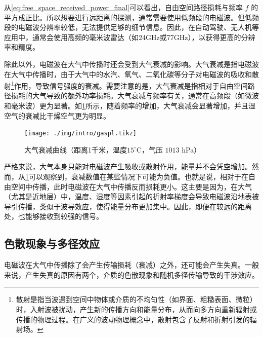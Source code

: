 从\cref{eq:free_space_received_power_final}可以看出，自由空间路径损耗与频率 $f$ 的平方成正比。所以想要进行远距离的探测，通常需要使用低频段的电磁波。但低频段的电磁波分辨率较低，无法提供足够的细节信息。因此，在自动驾驶、无人机等应用中，通常会使用高频的毫米波雷达（如24GHz或77GHz），以获得更高的分辨率和精度。

除此以外，电磁波在大气中传播时还会受到大气衰减的影响。大气衰减是指电磁波在大气中传播时，由于大气中的水汽、氧气、二氧化碳等分子对电磁波的吸收和散射\footnote{散射是指当波遇到空间中物体或介质的不均匀性（如界面、粗糙表面、微粒）时，入射波被扰动，产生新的传播方向和能量分布，从而向多方向重新辐射或传播的物理过程。在广义的波动物理概念中，散射包含了反射和折射引发的辐射场。}作用，导致信号强度的衰减。需要注意的是，大气衰减是指相对于自由空间路径损耗的大气导致的额外功率损耗。大气衰减与频率有关，通常在高频段（如微波和毫米波）更为显著。如\cref{fig_chp1_gaspl}所示，随着频率的增加，大气衰减会显著增加，并且湿空气的衰减比干燥空气更为明显。

\begin{figure}[htb!]
    \centering
    \texttt{[image: ./img/intro/gaspl.tikz]}
    \caption{大气衰减曲线\supercite{itu_r_p676_11}（距离1千米，温度$15^\circ$C，气压 $1013$ hPa）}
    \label{fig_chp1_gaspl}
\end{figure}

严格来说，大气本身只能对电磁波产生吸收或散射作用，能量并不会凭空增加。然而，从\cref{fig_chp1_gaspl}可以观察到，衰减数值在某些情况下可能为负值。也就是说，相对于在自由空间中传播，此时电磁波在大气中传播反而损耗更小。这主要是因为，在大气（尤其是近地层）中，温度、湿度等因素引起的折射率梯度会导致电磁波沿地表被导引传播，类似于波导效应，使得能量分布更加集中。因此，即便在较远的距离处，也能够接收到较强的信号。

\subsection{色散现象与多径效应}
电磁波在大气中传播除了会产生传输损耗（衰减）之外，还可能会产生失真。一般来说，产生失真的原因有两个，介质的色散现象和随机多径传输导致的干涉效应。

